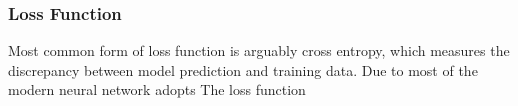 \subsubsection{Loss Function}

Most common form of loss function is arguably cross entropy, which measures the discrepancy between model prediction and training data. Due to most of the modern neural network adopts The loss function 